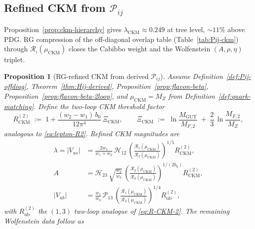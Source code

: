 \documentclass[11pt]{article}
\theoremstyle{plain}
\newtheorem{proposition}[theorem]{Proposition}
\theoremstyle{definition}
\theoremstyle{remark}
\numberwithin{equation}{section}
\begin{document}
\subsection{Refined CKM from $\mathcal{P}_{ij}$}
\label{sec:quark-precision:ckm}

Proposition~\ref{prop:ckm-hierarchy} gives
$\lambda_{\mathrm{CKM}}\approx0.249$ at tree level, $\sim11\%$ above PDG.
RG compression of the off-diagonal overlap table
(Table~\ref{tab:Pij-ckm}) through $\mathcal{R}_\iota(\mu_{\mathrm{CKM}})$
closes the Cabibbo weight and the Wolfenstein $(A,\rho,\eta)$ triplet.

\begin{proposition}[RG-refined CKM from derived $\mathcal{P}_{ij}$]
\label{prop:ckm-precision}
Assume Definition~\ref{def:Pij-offdiag}, Theorem~\ref{thm:Hij-derived},
Proposition~\ref{prop:flavon-beta}, Proposition~\ref{prop:flavon-beta-2loop},
and $\mu_{\mathrm{CKM}}=M_Z$ from Definition~\ref{def:quark-matching}.
Define the two-loop CKM threshold factor
\begin{equation}\label{eq:R-CKM-2}
  R_{\mathrm{CKM}}^{(2)}
  \;:=\;
  1 + \frac{(w_2-w_1)\,b_0}{12\pi^4}\,\Xi_{\mathrm{CKM}},
  \qquad
  \Xi_{\mathrm{CKM}}
  \;:=\;
  \ln\!\frac{M_{\mathrm{GUT}}}{M_{F,2}}
  \;+\;
  \frac{2}{3}\,\ln\!\frac{M_{F,2}}{M_Z},
\end{equation}
analogous to \eqref{eq:lepton-R2}. Refined CKM magnitudes are
\begin{align}
  \lambda = |V_{us}|
  &=
  \frac{2w_1}{w_1+w_2}\,\mathcal{H}_{12}\,
  \left(
    \frac{\mathcal{R}_1(\mu_{\mathrm{CKM}})}
         {\mathcal{R}_2(\mu_{\mathrm{CKM}})}
  \right)^{\!1/5}
  R_{\mathrm{CKM}}^{(2)},
  \label{eq:lambda-refined}\\
  A
  &=
  \mathcal{H}_{23}\,
  \sqrt{\frac{w_2}{w_3}}\,
  \left(
    \frac{\mathcal{R}_2(\mu_{\mathrm{CKM}})}
         {\mathcal{R}_3(\mu_{\mathrm{CKM}})}
  \right)^{\!1/(2b_0)}
  R_{\mathrm{CKM}}^{(2)},
  \label{eq:A-refined}\\
  |V_{ub}|
  &=
  \frac{w_1}{w_3}\,\mathcal{P}_{13}\,
  \left(
    \frac{\mathcal{R}_1(\mu_{\mathrm{CKM}})}
         {\mathcal{R}_3(\mu_{\mathrm{CKM}})}
  \right)^{\!1/4}
  R_{\mathrm{ub}}^{(2)},
  \label{eq:Vub-refined}
\end{align}
with $R_{\mathrm{ub}}^{(2)}$ the $(1,3)$ two-loop analogue of
\eqref{eq:R-CKM-2}. The remaining Wolfenstein data follow as
\begin{equation}\label{eq:wolfenstein-from-V}

\end{equation}
\end{proposition}
\end{document}
